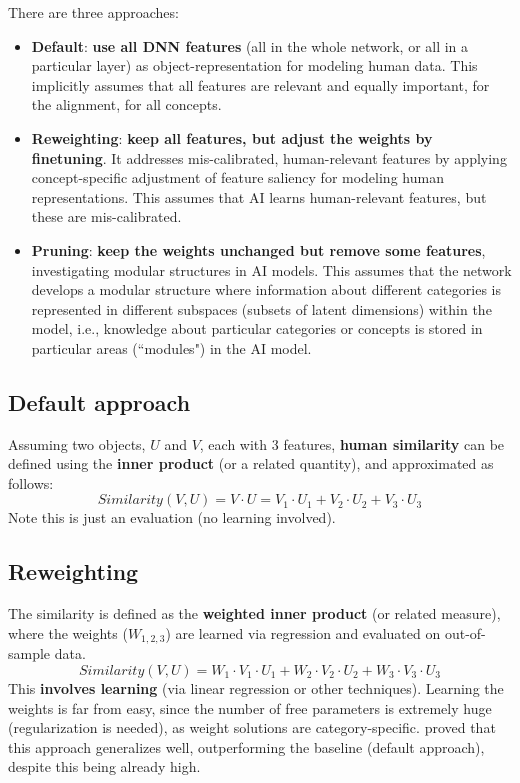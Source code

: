 There are three approaches:
\begin{itemize}
    \item \textbf{Default}: \textbf{use all DNN features} (all in the whole network, or all in a particular layer) as object-representation for modeling human data. This implicitly assumes that all features are relevant and equally important, for the alignment, for all concepts.
    \item \textbf{Reweighting}: \textbf{keep all features, but adjust the weights by finetuning}. It addresses mis-calibrated, human-relevant features by applying concept-specific adjustment of feature saliency for modeling human representations. This assumes that AI learns human-relevant features, but these are mis-calibrated.
    \item \textbf{Pruning}: \textbf{keep the weights unchanged but remove some features}, investigating modular structures in AI models. This assumes that the network develops a modular structure where information about different categories is represented in different subspaces (subsets of latent dimensions) within the model, i.e., knowledge about particular categories or concepts is stored in particular areas (``modules") in the AI model.
\end{itemize}

\subsection{Default approach}
Assuming two objects, $U$ and $V$, each with 3 features, \textbf{human similarity} can be defined using the \textbf{inner product} (or a related quantity), and approximated as follows:
\[
    Similarity(V,U) = V \cdot U = V_1 \cdot U_1 +  V_2 \cdot U_2 + V_3 \cdot U_3
\]
Note this is just an evaluation (no learning involved).

\subsection{Reweighting}
The similarity is defined as the \textbf{weighted inner product} (or related measure), where the weights ($W_{1,2,3}$) are learned via regression and evaluated on out-of-sample data.
\[
    Similarity(V,U) = W_1 \cdot V_1 \cdot U_1 + W_2 \cdot V_2 \cdot U_2 + W_3 \cdot V_3 \cdot U_3
\]
This \textbf{involves learning} (via linear regression or other techniques). Learning the weights is far from easy, since the number of free parameters is extremely huge (regularization is needed), as weight solutions are category-specific.
\notedv \cite{peterson} proved that this approach generalizes well, outperforming the baseline (default approach), despite this being already high.\\

